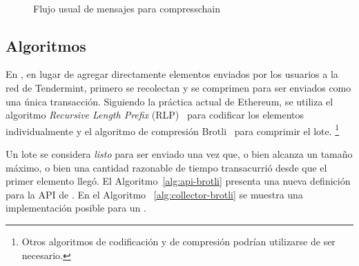 \begin{figure}
  \\
  \caption{Flujo usual de mensajes para compresschain}
  \label{fig:compresschain-flow}
\end{figure}

\subsection{Algoritmos}


%
%

%

En \compresschain, en lugar de agregar directamente elementos enviados por los usuarios a la red de Tendermint,
primero se recolectan y se comprimen para ser enviados como una única transacción.
Siguiendo la práctica actual de Ethereum, se utiliza el algoritmo
\textit{Recursive Length Prefix} (RLP)~\cite{ethereum} para codificar los elementos individualmente
y el algoritmo de compresión Brotli~\cite{brotli.compressor} para comprimir el lote.
\footnote{Otros algoritmos de codificación y de compresión podrían utilizarse de ser necesario.}

%
Un lote se considera \textit{listo} para ser enviado una vez que, o bien alcanza un tamaño máximo,
o bien una cantidad razonable de tiempo transacurrió desde que el primer elemento llegó. 
%
El Algoritmo~\ref{alg:api-brotli} presenta una nueva definición para la API de \setchain.
En el Algoritmo ~\ref{alg:collector-brotli} se muestra una implementación posible para un
\collector.

